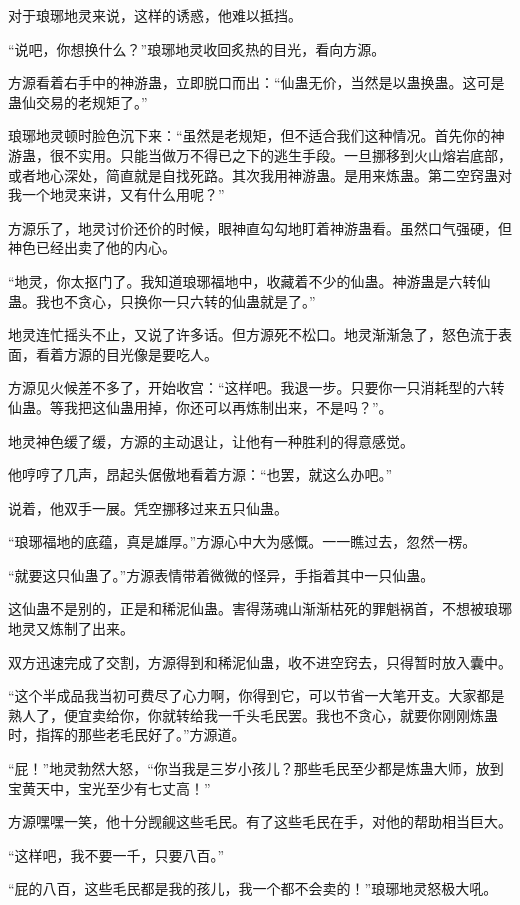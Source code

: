 \begin{this_body}
对于琅琊地灵来说，这样的诱惑，他难以抵挡。

“说吧，你想换什么？”琅琊地灵收回炙热的目光，看向方源。

方源看着右手中的神游蛊，立即脱口而出：“仙蛊无价，当然是以蛊换蛊。这可是蛊仙交易的老规矩了。”

琅琊地灵顿时脸色沉下来：“虽然是老规矩，但不适合我们这种情况。首先你的神游蛊，很不实用。只能当做万不得已之下的逃生手段。一旦挪移到火山熔岩底部，或者地心深处，简直就是自找死路。其次我用神游蛊。是用来炼蛊。第二空窍蛊对我一个地灵来讲，又有什么用呢？”

方源乐了，地灵讨价还价的时候，眼神直勾勾地盯着神游蛊看。虽然口气强硬，但神色已经出卖了他的内心。

“地灵，你太抠门了。我知道琅琊福地中，收藏着不少的仙蛊。神游蛊是六转仙蛊。我也不贪心，只换你一只六转的仙蛊就是了。”

地灵连忙摇头不止，又说了许多话。但方源死不松口。地灵渐渐急了，怒色流于表面，看着方源的目光像是要吃人。

方源见火候差不多了，开始收宫：“这样吧。我退一步。只要你一只消耗型的六转仙蛊。等我把这仙蛊用掉，你还可以再炼制出来，不是吗？”。

地灵神色缓了缓，方源的主动退让，让他有一种胜利的得意感觉。

他哼哼了几声，昂起头倨傲地看着方源：“也罢，就这么办吧。”

说着，他双手一展。凭空挪移过来五只仙蛊。

“琅琊福地的底蕴，真是雄厚。”方源心中大为感慨。一一瞧过去，忽然一楞。

“就要这只仙蛊了。”方源表情带着微微的怪异，手指着其中一只仙蛊。

这仙蛊不是别的，正是和稀泥仙蛊。害得荡魂山渐渐枯死的罪魁祸首，不想被琅琊地灵又炼制了出来。

双方迅速完成了交割，方源得到和稀泥仙蛊，收不进空窍去，只得暂时放入囊中。

“这个半成品我当初可费尽了心力啊，你得到它，可以节省一大笔开支。大家都是熟人了，便宜卖给你，你就转给我一千头毛民罢。我也不贪心，就要你刚刚炼蛊时，指挥的那些老毛民好了。”方源道。

“屁！”地灵勃然大怒，“你当我是三岁小孩儿？那些毛民至少都是炼蛊大师，放到宝黄天中，宝光至少有七丈高！”

方源嘿嘿一笑，他十分觊觎这些毛民。有了这些毛民在手，对他的帮助相当巨大。

“这样吧，我不要一千，只要八百。”

“屁的八百，这些毛民都是我的孩儿，我一个都不会卖的！”琅琊地灵怒极大吼。


\end{this_body}
